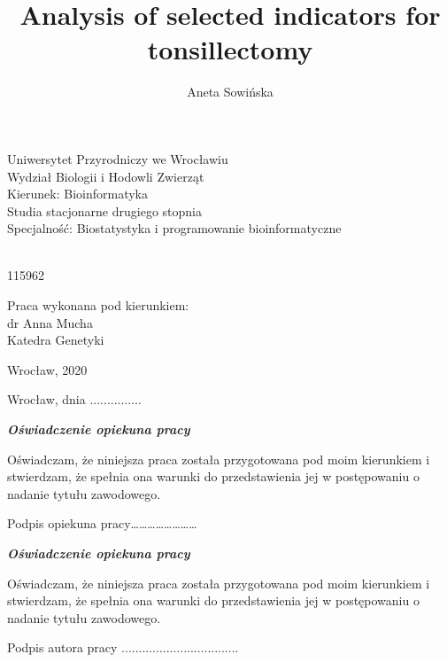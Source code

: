 \documentclass[12pt,a4paper,notitlepage]{report}
\author{Aneta Sowi\'nska}
\title{Analysis of selected indicators for tonsillectomy}
\makeatletter
\renewcommand{\maketitle}{\begin{titlepage}

    \begin{center}
    \LARGE Uniwersytet Przyrodniczy we Wroc\l{}awiu\\
    \Large Wydzia\l{} Biologii i Hodowli Zwierz\k{a}t\\
    \large Kierunek: Bioinformatyka\\
    Studia stacjonarne drugiego stopnia\\
    Specjalno\'s\'c: Biostatystyka i programowanie bioinformatyczne
    \end{center}

    \vspace{3cm}

    \begin{center}
    \huge \@author \\
    \large 115962
    
    \vspace{2cm}
    
     \textbf{\Huge \@title}
     \end{center}

    \vspace{5cm}
    
    \begin{flushright}
     {\large Praca wykonana pod kierunkiem:}\\
         dr Anna Mucha\\
         Katedra Genetyki
     \end{flushright}

    \vspace*{\stretch{6}}

    \begin{center}
    \Large Wroc\l{}aw, 2020
    \end{center}

  \end{titlepage}%
}
\makeatother
\begin{document}

\maketitle



\noindent Wroc\l{}aw, dnia ...............
\vspace{3cm}

\begin{flushleft}
\textbf{\textit{\large Oświadczenie opiekuna pracy}}
\end{flushleft}
Oświadczam, że niniejsza praca została przygotowana pod moim kierunkiem i stwierdzam, że spełnia ona warunki do przedstawienia jej w postępowaniu o nadanie tytułu zawodowego.
\vspace{2cm}
\begin{flushright}
Podpis opiekuna pracy……………………
\end{flushright}

\vspace{2cm}
\begin{flushleft}
\textbf{\textit{\large Oświadczenie opiekuna pracy}}
\end{flushleft}
Oświadczam, że niniejsza praca została przygotowana pod moim kierunkiem i stwierdzam, że spełnia ona warunki do przedstawienia jej w postępowaniu o nadanie tytułu zawodowego.
\vspace{2cm}
\begin{flushright}
Podpis autora pracy ..................................
\end{flushright}

\end{document}
